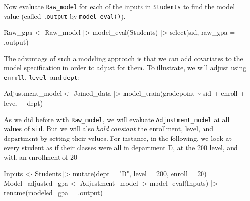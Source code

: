 \documentclass[
  letterpaper,
  DIV=11,
  numbers=noendperiod,
  oneside]{scrartcl}
\newenvironment{Shaded}{\begin{snugshade}}{\end{snugshade}}
\newcommand{\AttributeTok}[1]{\textcolor[rgb]{0.40,0.45,0.13}{#1}}
\newcommand{\DecValTok}[1]{\textcolor[rgb]{0.68,0.00,0.00}{#1}}
\newcommand{\FunctionTok}[1]{\textcolor[rgb]{0.28,0.35,0.67}{#1}}
\newcommand{\NormalTok}[1]{\textcolor[rgb]{0.00,0.23,0.31}{#1}}
\newcommand{\OtherTok}[1]{\textcolor[rgb]{0.00,0.23,0.31}{#1}}
\newcommand{\SpecialCharTok}[1]{\textcolor[rgb]{0.37,0.37,0.37}{#1}}
\newcommand{\StringTok}[1]{\textcolor[rgb]{0.13,0.47,0.30}{#1}}
\begin{document}
Now evaluate \texttt{Raw\_model} for each of the inputs in
\texttt{Students} to find the model value (called \texttt{.output} by
\texttt{model\_eval()}).

\begin{Shaded}
\begin{Highlighting}[]
\NormalTok{Raw\_gpa }\OtherTok{\textless{}{-}}\NormalTok{ Raw\_model }\SpecialCharTok{|\textgreater{}}
  \FunctionTok{model\_eval}\NormalTok{(Students) }\SpecialCharTok{|\textgreater{}}
  \FunctionTok{select}\NormalTok{(sid, }\AttributeTok{raw\_gpa =}\NormalTok{ .output)}
\end{Highlighting}
\end{Shaded}

The advantage of such a modeling approach is that we can add covariates
to the model specification in order to adjust for them. To illustrate,
we will adjust using \texttt{enroll}, \texttt{level}, and \texttt{dept}:

\begin{Shaded}
\begin{Highlighting}[]
\NormalTok{Adjustment\_model }\OtherTok{\textless{}{-}}
\NormalTok{  Joined\_data }\SpecialCharTok{|\textgreater{}}
  \FunctionTok{model\_train}\NormalTok{(gradepoint }\SpecialCharTok{\textasciitilde{}}\NormalTok{ sid }\SpecialCharTok{+}\NormalTok{ enroll }\SpecialCharTok{+}\NormalTok{ level }\SpecialCharTok{+}\NormalTok{ dept)}
\end{Highlighting}
\end{Shaded}

As we did before with \texttt{Raw\_model}, we will evaluate
\texttt{Adjustment\_model} at all values of \texttt{sid}. But we will
also \emph{hold constant} the enrollment, level, and department by
setting their values. For instance, in the following, we look at every
student as if their classes were all in department D, at the 200 level,
and with an enrollment of 20.

\begin{Shaded}
\begin{Highlighting}[]
\NormalTok{Inputs }\OtherTok{\textless{}{-}}\NormalTok{ Students }\SpecialCharTok{|\textgreater{}}
  \FunctionTok{mutate}\NormalTok{(}\AttributeTok{dept =} \StringTok{"D"}\NormalTok{, }\AttributeTok{level =} \DecValTok{200}\NormalTok{, }\AttributeTok{enroll =} \DecValTok{20}\NormalTok{)}
\NormalTok{Model\_adjusted\_gpa }\OtherTok{\textless{}{-}}
\NormalTok{  Adjustment\_model }\SpecialCharTok{|\textgreater{}}
  \FunctionTok{model\_eval}\NormalTok{(Inputs) }\SpecialCharTok{|\textgreater{}}
  \FunctionTok{rename}\NormalTok{(}\AttributeTok{modeled\_gpa =}\NormalTok{ .output)}
\end{Highlighting}
\end{Shaded}
\end{document}
